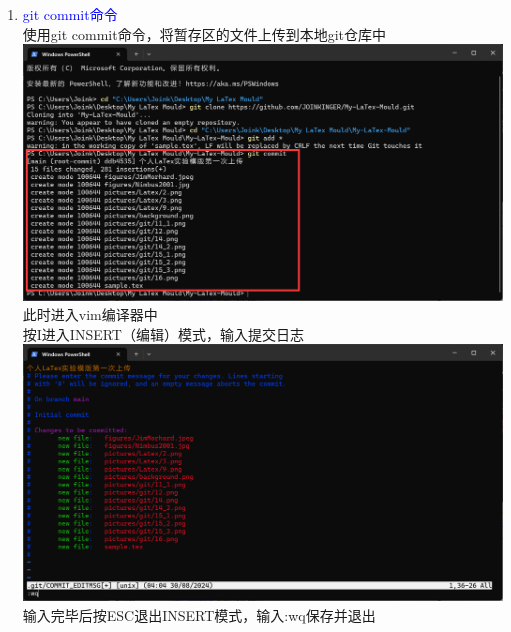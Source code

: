 \documentclass[12pt,a4paper,UTF8]{article}
\begin{document}
\begin{enumerate}
        \item \textcolor{blue}{git commit命令}\\
        使用git commit命令，将暂存区的文件上传到本地git仓库中\\[6pt]
        \includegraphics[scale=0.25]{pictures/git/18_1.png}\\
        此时进入vim编译器中\\
        按I进入INSERT（编辑）模式，输入提交日志\\[6pt]
        \includegraphics[scale=0.25]{pictures/git/18_3.png}\\
        输入完毕后按ESC退出INSERT模式，输入:wq保存并退出
        

\end{enumerate}
\end{document}
